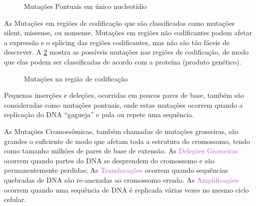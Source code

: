 \documentclass[11pt,a4paper]{article}
\begin{document}
		\begin{figure}[h]
			\centering
			\caption{Mutações Pontuais em único nucleotídio}
			\label{fig:mutacoesPontuais1}
		\end{figure}
		
		As \textcolor{CarnationPink}{Mutações em regiões de codificação} que são classificadas como mutações silent, missense, ou nonsense. Mutações em regiões não codificantes podem afetar a expressão e o splicing das regiões codificantes, mas não são tão fáceis de descrever. A \ref{fig:mutacoesPontuais2} mostra as possíveis mutações nas regiões de codificação, de modo que elas podem ser classificadas de acordo com a proteína (produto genético). 

		\begin{figure}[h]
			\centering
			\caption{Mutações na região de codificação}
			\label{fig:mutacoesPontuais2}
		\end{figure}

		\textcolor{CarnationPink}{Pequenas inserções e deleções}, ocorridas em poucos pares de base, também são consideradas como mutações pontuais, onde estas mutações ocorrem quando a replicação do DNA “gagueja” e pula ou repete uma sequência. 

		As \textcolor{CarnationPink}{Mutações Cromossômicas}, também chamadas de mutações grosseiras, são grandes o suficiente de modo que afetam toda a estrutura do cromossomo, tendo como tamanho milhões de pares de base de extensão.  As \textcolor{MediumOrchid}{Deleções Grosseiras} ocorrem quando partes do DNA se desprendem do cromossomo e são permanentemente perdidas;  As \textcolor{MediumOrchid}{Translocações} ocorrem quando sequências quebradas de DNA são re-anexadas ao cromossomo errado.  As \textcolor{MediumOrchid}{Amplificações} ocorrem quando uma sequência de DNA é replicada várias vezes no mesmo ciclo celular.
\end{document}
